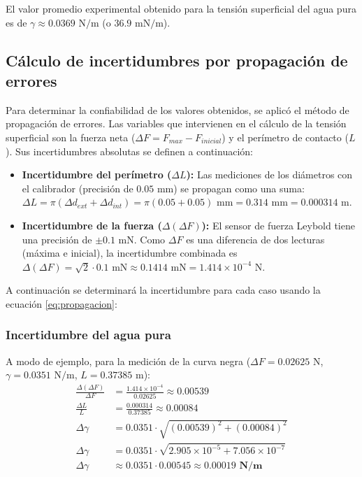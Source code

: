 \documentclass[11pt,a4paper]{article}
\begin{document}
El valor promedio experimental obtenido para la tensión superficial del agua pura es de \(\gamma \approx 0.0369 \text{ N/m}\) (o \(36.9 \text{ mN/m}\)). 





\subsection{Cálculo de incertidumbres por propagación de errores}

Para determinar la confiabilidad de los valores obtenidos, se aplicó el método de propagación de errores. Las variables que intervienen en el cálculo de la tensión superficial son la fuerza neta (\(\Delta F = F_{max} - F_{inicial}\)) y el perímetro de contacto (\(L\)). Sus incertidumbres absolutas se definen a continuación:

\begin{itemize}
    \item \textbf{Incertidumbre del perímetro (\(\Delta L\)):} Las mediciones de los diámetros con el calibrador (precisión de \(0.05 \text{ mm}\)) se propagan como una suma: 
    \(\Delta L = \pi (\Delta d_{ext} + \Delta d_{int}) = \pi(0.05 + 0.05) \text{ mm} = 0.314 \text{ mm} = 0.000314 \text{ m}\).
    \item \textbf{Incertidumbre de la fuerza (\(\Delta (\Delta F)\)):} El sensor de fuerza Leybold tiene una precisión de \(\pm 0.1 \text{ mN}\). Como \(\Delta F\) es una diferencia de dos lecturas (máxima e inicial), la incertidumbre combinada es \(\Delta (\Delta F) = \sqrt{2} \cdot 0.1 \text{ mN} \approx 0.1414 \text{ mN} = 1.414 \times 10^{-4} \text{ N}\).
\end{itemize}

A continuación se determinará la incertidumbre para cada caso usando la ecuación \eqref{eq:propagacion}:


\subsubsection{Incertidumbre del agua pura}

A modo de ejemplo, para la medición de la curva negra (\(\Delta F = 0.02625 \text{ N}\), \(\gamma = 0.0351 \text{ N/m}\), \(L = 0.37385 \text{ m}\)):
\begin{align*}
    \frac{\Delta (\Delta F)}{\Delta F} &= \frac{1.414 \times 10^{-4}}{0.02625} \approx 0.00539 \\
    \frac{\Delta L}{L} &= \frac{0.000314}{0.37385} \approx 0.00084 \\
    \Delta \gamma &= 0.0351 \cdot \sqrt{(0.00539)^2 + (0.00084)^2} \\
    \Delta \gamma &= 0.0351 \cdot \sqrt{2.905 \times 10^{-5} + 7.056 \times 10^{-7}} \\
    \Delta \gamma &\approx 0.0351 \cdot 0.00545 \approx \mathbf{0.00019 \text{ N/m}}
\end{align*}
\end{document}
